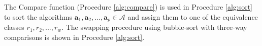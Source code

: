 \documentclass[conference]{IEEEtran}
\newcommand{\p}[1]{{\color{blue} Pdj: #1}}
\begin{document}
The Compare function (Procedure \ref{alg:compare}) is used in Procedure \ref{alg:sort} to sort the algorithms $\mathbf{a}_1,\mathbf{a}_2, ..., \mathbf{a}_p \in \mathcal{A}$ and assign them to one of the equivalence classes $r_1, r_2, ..., r_w$.
The swapping procedure using bubble-sort\cite{bubblesort} with three-way comparisons is shown in Procedure \ref{alg:sort}.
\end{document}
